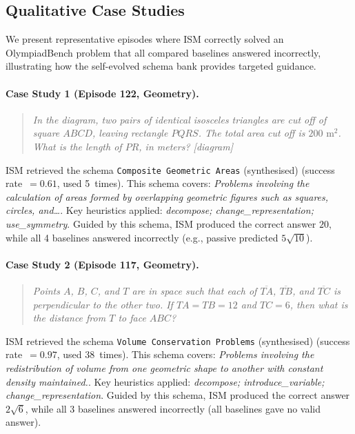 \subsection*{Qualitative Case Studies}
We present representative episodes where ISM correctly solved an OlympiadBench problem that all compared baselines answered incorrectly, illustrating how the self-evolved schema bank provides targeted guidance.

\paragraph{Case Study 1 (Episode 122, Geometry).}
\begin{quote}\itshape
In the diagram, two pairs of identical isosceles triangles are cut off of square $ABCD$, leaving rectangle $PQRS$. The total area cut off is $200 \text{ m}^2$. What is the length of $PR$, in meters? \textit{[diagram]}
\end{quote}

ISM retrieved the schema \texttt{Composite Geometric Areas} (synthesised) (success rate~$=0.61$, used 5~times). 
This schema covers: \textit{Problems involving the calculation of areas formed by overlapping geometric figures such as squares, circles, and\ldots}. 
Key heuristics applied: \textit{decompose; change_representation; use_symmetry}. 
Guided by this schema, ISM produced the correct answer $\boxed{20}$, while all 4 baselines answered incorrectly (e.g., passive predicted $5\sqrt{10}$). 

\paragraph{Case Study 2 (Episode 117, Geometry).}
\begin{quote}\itshape
Points $A$, $B$, $C$, and $T$ are in space such that each of $\overline{TA}$, $\overline{TB}$, and $\overline{TC}$ is perpendicular to the other two.  If $TA = TB = 12$ and $TC = 6$, then what is the distance from $T$ to face $ABC$?
\end{quote}

ISM retrieved the schema \texttt{Volume Conservation Problems} (synthesised) (success rate~$=0.97$, used 38~times). 
This schema covers: \textit{Problems involving the redistribution of volume from one geometric shape to another with constant density maintained.}. 
Key heuristics applied: \textit{decompose; introduce_variable; change_representation}. 
Guided by this schema, ISM produced the correct answer $\boxed{2 \sqrt{6}}$, while all 3 baselines answered incorrectly (all baselines gave no valid answer). 

